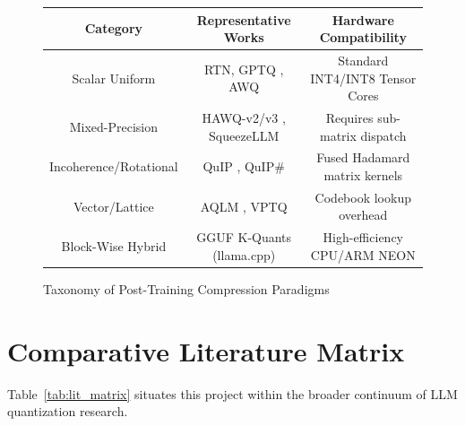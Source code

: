 \documentclass[12pt,a4paper,oneside]{report}
\begin{document}
    \begin{figure}[h!]
    \centering
    \begin{tabular}{|c|c|c|}
    \hline
    \textbf{Category} & \textbf{Representative Works} & \textbf{Hardware Compatibility} \\
    \hline
    Scalar Uniform & RTN, GPTQ \cite{frantar2023gptq}, AWQ \cite{lin2024awq} & Standard INT4/INT8 Tensor Cores \\
    Mixed-Precision & HAWQ-v2/v3 \cite{dong2020hawq}, SqueezeLLM \cite{kim2023squeezellm} & Requires sub-matrix dispatch \\
    Incoherence/Rotational & QuIP \cite{chee2023quip}, QuIP\# \cite{tseng2024quip} & Fused Hadamard matrix kernels \\
    Vector/Lattice & AQLM \cite{egorov2024extreme}, VPTQ \cite{guo2024vptq} & Codebook lookup overhead \\
    Block-Wise Hybrid & GGUF K-Quants (llama.cpp) & High-efficiency CPU/ARM NEON \\
    \hline
    \end{tabular}
    \caption{Taxonomy of Post-Training Compression Paradigms}
    \label{fig:quant_taxonomy}
    \end{figure}

    \section{Comparative Literature Matrix}
    Table~\ref{tab:lit_matrix} situates this project within the broader continuum of LLM quantization research.
\end{document}
